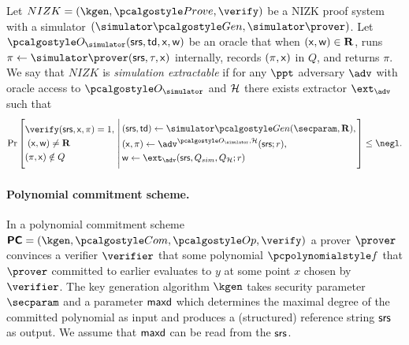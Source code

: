 \documentclass[runningheads,11pt]{llncs}
\begin{document}
\begin{definition}
  \label{def:sepcom}
  Let $NIZK = (\kgen, \prove, \verify)$ be a NIZK proof system
  with a simulator $(\simgen, \simprove)$.
  Let $\oracles(\srs, \td, \inp, \wit)$ be an oracle that when $(\mathsf{x}, \mathsf{w})\in
  \mathbf{R}$, runs $\pi \gets \simprove(\srs, \tau, \inp)$ internally, records $(\pi,\mathsf{x})$ in $Q$, and returns $\pi$.
  We say that $NIZK$ is \emph{simulation extractable} if for any $\ppt$
  adversary $\adv$ with oracle access to $\oracles$ and $\mathcal{H}$ there exists extractor
  $\ext_{\adv}$ such that
\[
  \Pr \left[
    \begin{aligned}
      & \verify(\srs, \inp, \pi) = 1, \\
      & \;(\inp, \wit) \neq \REL\\
      & (\pi,\inp) \notin Q
    \end{aligned}
    \,\left|\,
      \vphantom{
        \begin{aligned}
          & \\
          & \\
          & \\
          &
        \end{aligned}
        }
    \begin{aligned}
      & (\srs, \td) \gets \simgen(\secparam, \REL),\\
      & (\inp, \pi) \gets \adv^{\oracles,\ro}(\srs; r), \\
      & \wit \gets \ext_\adv(\srs, Q_{sim}, Q_{\ro}; r)
    \end{aligned}
  \right.\right]
  \leq \negl.
\]
\end{definition}

\paragraph{Polynomial commitment scheme.}
\label{sec:poly_com}
In a polynomial commitment scheme $\PCOM = (\kgen, \com, \open, \verify)$ a
prover $\prover$ convinces a verifier $\verifier$ that some polynomial $\p{f}$
that $\prover$ committed to earlier evaluates to $y$ at some point $x$ chosen by
$\verifier$. The key generation algorithm $\kgen$ takes security
parameter $\secparam$ and a parameter $\mathsf{maxd}$ which determines the maximal
degree of the committed polynomial as input and produces a (structured) reference string $\mathsf{srs}$ as output. We assume that $\mathsf{maxd}$ can be read from
the $\mathsf{srs}$.
  
\end{document}

